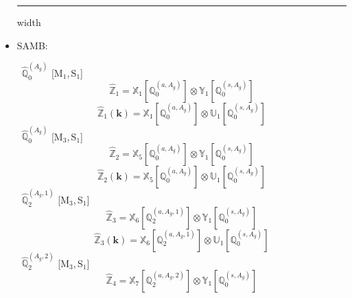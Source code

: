 \documentclass[fleqn,10pt,landscape]{article}
\begin{document}
\begin{itemize}
 \hfil \hrule height 1mm width \textwidth \hfil

\item SAMB:

\vspace{4mm}
\noindent {} $\,\,\,\hat{\mathbb{Q}}_{0}^{(A_{g})}$ [M$_{1}$,\,S$_{1}$]
\begin{dmath*}
\hat{\mathbb{Z}}_{1}=\mathbb{X}_{1}[\mathbb{Q}_{0}^{(a,A_{g})}] \otimes\mathbb{Y}_{1}[\mathbb{Q}_{0}^{(s,A_{g})}]
\end{dmath*}
\begin{dmath*}
\hat{\mathbb{Z}}_{1}(\bm{k})=\mathbb{X}_{1}[\mathbb{Q}_{0}^{(a,A_{g})}] \otimes\mathbb{U}_{1}[\mathbb{Q}_{0}^{(s,A_{g})}]
\end{dmath*}
\vspace{4mm}
\noindent {} $\,\,\,\hat{\mathbb{Q}}_{0}^{(A_{g})}$ [M$_{3}$,\,S$_{1}$]
\begin{dmath*}
\hat{\mathbb{Z}}_{2}=\mathbb{X}_{5}[\mathbb{Q}_{0}^{(a,A_{g})}] \otimes\mathbb{Y}_{1}[\mathbb{Q}_{0}^{(s,A_{g})}]
\end{dmath*}
\begin{dmath*}
\hat{\mathbb{Z}}_{2}(\bm{k})=\mathbb{X}_{5}[\mathbb{Q}_{0}^{(a,A_{g})}] \otimes\mathbb{U}_{1}[\mathbb{Q}_{0}^{(s,A_{g})}]
\end{dmath*}
\vspace{4mm}
\noindent {} $\,\,\,\hat{\mathbb{Q}}_{2}^{(A_{g},1)}$ [M$_{3}$,\,S$_{1}$]
\begin{dmath*}
\hat{\mathbb{Z}}_{3}=\mathbb{X}_{6}[\mathbb{Q}_{2}^{(a,A_{g},1)}] \otimes\mathbb{Y}_{1}[\mathbb{Q}_{0}^{(s,A_{g})}]
\end{dmath*}
\begin{dmath*}
\hat{\mathbb{Z}}_{3}(\bm{k})=\mathbb{X}_{6}[\mathbb{Q}_{2}^{(a,A_{g},1)}] \otimes\mathbb{U}_{1}[\mathbb{Q}_{0}^{(s,A_{g})}]
\end{dmath*}
\vspace{4mm}
\noindent {} $\,\,\,\hat{\mathbb{Q}}_{2}^{(A_{g},2)}$ [M$_{3}$,\,S$_{1}$]
\begin{dmath*}
\hat{\mathbb{Z}}_{4}=\mathbb{X}_{7}[\mathbb{Q}_{2}^{(a,A_{g},2)}] \otimes\mathbb{Y}_{1}[\mathbb{Q}_{0}^{(s,A_{g})}]
\end{dmath*}
\begin{dmath*}

\end{dmath*}
\end{itemize}
\end{document}
